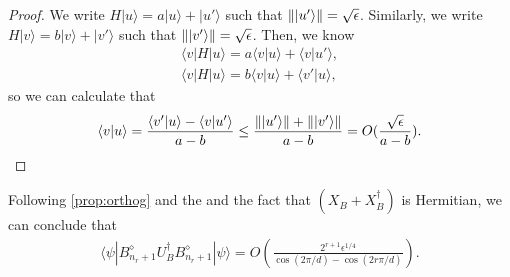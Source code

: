 \documentclass[11pt,letterpaper]{article}
\newcommand{\ket}[1]{|#1\rangle}
\newcommand{\bra}[1]{\langle#1|}
\newcommand{\braket}[2]{\langle#1|#2\rangle}
\newcommand{\ct}{^{\dagger}}
\DeclarePairedDelimiter{\norm}{\lVert}{\rVert}
\newcommand{\1}{\mathbb{1}}
\theoremstyle{definition}
\begin{document}
\begin{proof}
	We write $H\ket{u} = a\ket{u} + \ket{u'}$ such that $\norm{\ket{u'}} = \sqrt{\epsilon}$.
	Similarly, we write $H\ket{v} = b\ket{v} + \ket{v'}$ such that $\norm{\ket{v'}} = \sqrt{\epsilon}$.
	Then, we know
	\begin{align}
		\bra{v}H\ket{u} = a\braket{v}{u} + \braket{v}{u'},\\
		\bra{v}H\ket{u}  =b\braket{v}{u} + \braket{v'}{u},
	\end{align}
	so we can calculate that
	\begin{align}
		\braket{v}{u} = \frac{\braket{v'}{u} -  \braket{v}{u'}}{a-b} \leq \frac{\norm{\ket{u'}}+\norm{\ket{v'}}}{a-b} = O(\frac{\sqrt{\epsilon}}{a-b}).
	\end{align}
\end{proof}
Following \cref{prop:orthog} and the 
and the fact that $(X_B + X_B\ct)$ is Hermitian, we can conclude that
\begin{align}
\bra{\psi}B_{n_r+1}^\diamond U_B\ct B_{n_r+1}^\diamond \ket{\psi} = O(\frac{2^{r+1}\epsilon^{1/4}}{\cos(2\pi/d) - \cos(2r\pi/d)}).
\end{align}
\end{document}
